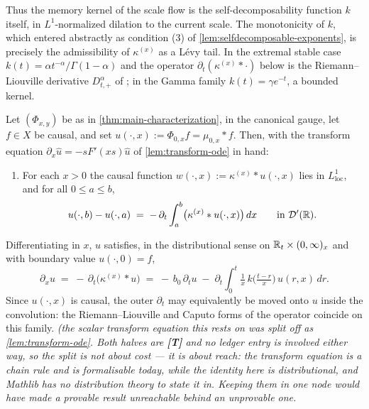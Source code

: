 \bigskip

Thus the memory kernel of the scale flow is the self-decomposability function $k$ itself, in
$L^1$-normalized dilation to the current scale. The monotonicity of $k$, which entered
abstractly as condition (3) of \ref{lem:selfdecomposable-exponents}, is precisely the
admissibility of $\kappa^{(x)}$ as a Lévy tail. In the extremal stable case
$k(t) = \alpha t^{-\alpha}/\Gamma(1-\alpha)$ and the operator $\partial_t(\kappa^{(x)} * \cdot)$
below is the Riemann--Liouville derivative $D^{\alpha}_{t,+}$ of
; in the Gamma family $k(t) = \gamma e^{-t}$, a bounded kernel.

\begin{proposition}\label{prop:scale-evolution}
Let $(\Phi_{x,y})$ be as in \ref{thm:main-characterization}, in the canonical gauge, let
$f \in X$ be causal, and set $u(\cdot, x) := \Phi_{0,x} f = \mu_{0,x} * f$. Then, with the
transform equation $\partial_x \hat u = -sF'(xs)\hat u$ of \ref{lem:transform-ode} in hand:
\begin{enumerate}
\item[] For each $x > 0$ the causal function $w(\cdot, x) := \kappa^{(x)} * u(\cdot, x)$ lies in
$L^1_{\mathrm{loc}}$, and for all $0 \le a \le b$,
\[
  u(\cdot, b) - u(\cdot, a)
  \;=\; -\,\partial_t \int_a^b \bigl(\kappa^{(x)} * u(\cdot, x)\bigr)\,dx
  \qquad \text{in } \mathcal{D}'(\mathbb{R}).
\]
\end{enumerate}
Differentiating in $x$, $u$ satisfies, in the distributional sense on
$\mathbb{R}_t \times (0,\infty)_x$ and with boundary value $u(\cdot, 0) = f$,
\[
  \partial_x u \;=\; -\,\partial_t\bigl(\kappa^{(x)} * u\bigr)
  \;=\; -\,b_0\,\partial_t u
  \;-\; \partial_t \int_0^t \tfrac{1}{x}\,k\bigl(\tfrac{t-r}{x}\bigr)\,u(r, x)\,dr .
\]
Since $u(\cdot, x)$ is causal, the outer $\partial_t$ may equivalently be moved onto $u$ inside
the convolution: the Riemann--Liouville and Caputo forms of the operator coincide on this
family.
\statusT\quad\emph{(the scalar transform equation this rests on was split off as
\ref{lem:transform-ode}. Both halves are \textbf{[T]} and no ledger entry is involved either
way, so the split is not about cost --- it is about \emph{reach}: the transform equation is a
chain rule and is formalisable today, while the identity here is distributional, and Mathlib has
no distribution theory to state it in. Keeping them in one node would have made a provable
result unreachable behind an unprovable one.}


\end{proposition}
